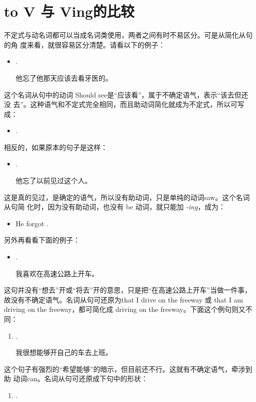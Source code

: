 \section{to V 与 Ving的比较}

不定式与动名词都可以当成名词类使用，两者之间有时不易区分。可是从简化从句的角
度来看，就很容易区分清楚。请看以下的例子：
\begin{itemize}
\item {}  .

  他忘了他那天应该去看牙医的。
\end{itemize}
这个名词从句中的动词 Should see是“应该看”，属于不确定语气，表示“该去但还没
去”。这种语气和不定式完全相同，而且助动词简化就成为不定式，所以可写成：
\begin{itemize}
\item {}  .
\end{itemize}
相反的，如果原本的句子是这样：
\begin{itemize}
\item {}  .

  他忘了以前见过这个人。
\end{itemize}
这是真的见过，是确定的语气，所以没有助动词，只是单纯的动词saw。这个名词从句简
化时，因为没有助动词，也没有 be 动词，就只能加 \emph{-ing}，成为：
\begin{itemize}
\item He forgot .
\end{itemize}

另外再看看下面的例子：
\begin{itemize}
\item {}  .

  我喜欢在高速公路上开车。
\end{itemize}
这句并没有“想去”开或“将去”开的意思，只是把“在高速公路上开车”当做一件事，
故没有不确定语气。名词从句可还原为that I drive on the freeway 或 that I am
driving on the freeway，都可简化成 driving on the freeway。下面这个例句则又不
同：
\begin{enumerate}
\item {}  .

  我很想能够开自己的车去上班。
\end{enumerate}
这个句子有强烈的“希望能够”的暗示，但目前还不行。这就有不确定语气，牵涉到助
动词can。名词从句可还原成下句中的形状：
\begin{enumerate}[resume]
\item {}  .
\end{enumerate}

